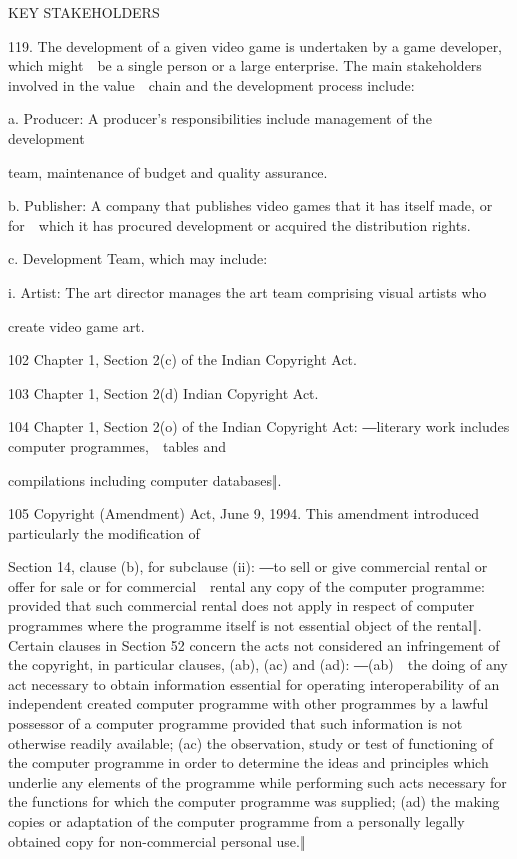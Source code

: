 \documentclass[
]{article}
\begin{document}
{KEY STAKEHOLDERS}

{119. }{The development of a given video game is undertaken by a game
developer, which might~~be a single person or a large enterprise. The
main stakeholders involved in the value~~chain and the development
process include:}

{a. }{Producer: A producer's responsibilities include management of the
development}

{team, maintenance of budget and quality assurance.}

{b. Publisher: A company that publishes video games that it has itself
made, or for~~which it has procured development or acquired the
distribution rights.}

{c. Development Team, which may include:}

{i. }{Artist: The art director manages the art team comprising visual
artists who}

{create video game art.}

{102 }{Chapter 1, Section 2(c) of the Indian }{Copyright Act}{.}

{103 }{Chapter 1, Section 2(d) Indian }{Copyright Act}{.}

{104 }{Chapter 1, Section 2(o) of the Indian }{Copyright Act}{:
―}{literary work includes computer programmes,~~tables and}

{compilations including computer databases‖.}

{105 }{Copyright (Amendment) Act}{, June 9, 1994. This amendment
introduced particularly the modification of}

{Section 14, clause (b), for subclause }{(ii): ―}{to sell or give
commercial rental or offer for sale or for commercial~~rental any copy
of the computer programme: provided that such commercial rental does not
apply in respect of computer }{programmes where the programme itself is
not essential object of the rental‖}{. }{Certain clauses in Section 52
concern }{the acts not considered an infringement of the copyright, in
particular clauses, (ab), (ac) and (ad): ―}{(ab)~~the doing of any act
necessary to obtain information essential for operating interoperability
of an independent created computer programme with other programmes by a
lawful possessor of a computer programme provided that such information
is not otherwise readily available; (ac) the observation, study or test
of functioning of the computer programme in order to determine the ideas
and principles which underlie any elements of the programme while
performing such acts necessary for the functions for which the computer
programme was supplied; (ad) the making copies or adaptation of the
computer programme from a personally legally obtained copy for
non-commercial personal use.}{‖}
\end{document}
